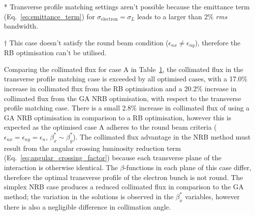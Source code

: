 \documentclass[../main.tex]{subfiles}
\begin{document}
\begin{table}[!h]
\begin{threeparttable}
\begin{tabular}{lccccc}
\hline\hline
\end{tabular}
\begin{tablenotes}
\item[*]{Transverse profile matching settings aren't possible because the emittance term (Eq.~\ref{eq:emittance_term}) for $\sigma_{\mathrm{electron}} = \sigma_{L}$ leads to a larger than 2\% \textit{rms} bandwidth.}
\item[$\dagger$]{This case doesn't satisfy the round beam condition ($\epsilon_{nx} \neq \epsilon_{ny}$), therefore the RB optimisation can't be utilised.}
\end{tablenotes}
\end{threeparttable}
\label{tab:single_point_optimisations}
\end{table}

Comparing the collimated flux for case A in Table~\ref{tab:single_point_optimisations}, the collimated flux in the transverse profile matching case is exceeded by all optimised cases, with a 17.0\% increase in collimated flux from the RB optimisation and a 20.2\% increase in collimated flux from the GA NRB optimisation, with respect to the transverse profile matching case. There is a small 2.8\% increase in collimated flux of using a GA NRB optimisation in comparison to a RB optimisation, however this is expected as the optimised case A adheres to the round beam criteria ($\epsilon_{nx}=\epsilon_{ny}=\epsilon_{n}$, $\beta_{x}^{*}\sim\beta_{y}^{*}$). The collimated flux advantage in the NRB method must result from the angular crossing luminosity reduction term (Eq.~\ref{eq:angular_crossing_factor}) because each transverse plane of the interaction is otherwise identical. The $\beta$-functions in each plane of this case differ, therefore the optimal transverse profile of the electron bunch is not round. The simplex NRB case produces a reduced collimated flux in comparison to the GA method; the variation in the solutions is observed in the $\beta_{x}^{*}$ variables, however there is also a negligible difference in collimation angle. 
\end{document}
